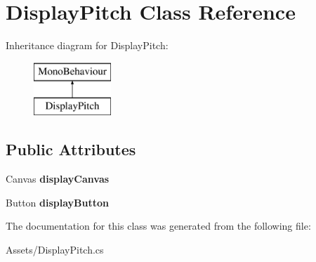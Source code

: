 \hypertarget{class_display_pitch}{}\section{Display\+Pitch Class Reference}
\label{class_display_pitch}
Inheritance diagram for Display\+Pitch\+:\begin{figure}[H]
\begin{center}
\leavevmode
\includegraphics[height=2.000000cm]{class_display_pitch}
\end{center}
\end{figure}
\subsection*{Public Attributes}
\begin{DoxyCompactItemize}
\item 
Canvas {\bfseries display\+Canvas}\hypertarget{class_display_pitch_a947bb51700263e5712ea6fe91575109e}{}\label{class_display_pitch_a947bb51700263e5712ea6fe91575109e}

\item 
Button {\bfseries display\+Button}\hypertarget{class_display_pitch_aff8bc3064e9306b19f6b40e4b16ee594}{}\label{class_display_pitch_aff8bc3064e9306b19f6b40e4b16ee594}

\end{DoxyCompactItemize}


The documentation for this class was generated from the following file\+:\begin{DoxyCompactItemize}
\item 
Assets/Display\+Pitch.\+cs\end{DoxyCompactItemize}
